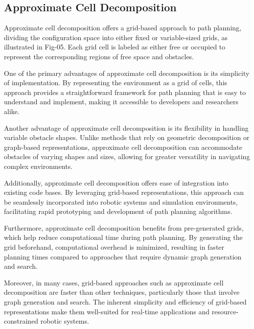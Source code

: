 \subsection{Approximate Cell Decomposition} 


Approximate cell decomposition offers a grid-based approach to path planning, dividing the configuration space into either fixed or variable-sized grids, as illustrated in Fig-05. Each grid cell is labeled as either free or occupied to represent the corresponding regions of free space and obstacles.

\vspace*{6mm}

One of the primary advantages of approximate cell decomposition is its simplicity of implementation. By representing the environment as a grid of cells, this approach provides a straightforward framework for path planning that is easy to understand and implement, making it accessible to developers and researchers alike.

\vspace*{6mm}

Another advantage of approximate cell decomposition is its flexibility in handling variable obstacle shapes. Unlike methods that rely on geometric decomposition or graph-based representations, approximate cell decomposition can accommodate obstacles of varying shapes and sizes, allowing for greater versatility in navigating complex environments.

\vspace*{6mm}

Additionally, approximate cell decomposition offers ease of integration into existing code bases. By leveraging grid-based representations, this approach can be seamlessly incorporated into robotic systems and simulation environments, facilitating rapid prototyping and development of path planning algorithms.

\vspace*{6mm}

Furthermore, approximate cell decomposition benefits from pre-generated grids, which help reduce computational time during path planning. By generating the grid beforehand, computational overhead is minimized, resulting in faster planning times compared to approaches that require dynamic graph generation and search.

\vspace*{6mm}

Moreover, in many cases, grid-based approaches such as approximate cell decomposition are faster than other techniques, particularly those that involve graph generation and search. The inherent simplicity and efficiency of grid-based representations make them well-suited for real-time applications and resource-constrained robotic systems.

